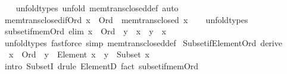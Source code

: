 \begin{isabellebody}
%
\isadelimproof
\ \ %
\endisadelimproof
%
\isatagproof
{}\isamarkupfalse%
\ unfold{\isacharunderscore}{\kern0pt}types\ {\isacharparenleft}{\kern0pt}unfold\ mem{\isacharunderscore}{\kern0pt}trans{\isacharunderscore}{\kern0pt}closed{\isacharunderscore}{\kern0pt}def{\isacharcomma}{\kern0pt}\ auto{\isacharparenright}{\kern0pt}%
\endisatagproof
{\isafoldproof}%
%
\isadelimproof
\isanewline
%
\endisadelimproof
\isanewline
{}\isamarkupfalse%
\ mem{\isacharunderscore}{\kern0pt}trans{\isacharunderscore}{\kern0pt}closed{\isacharunderscore}{\kern0pt}if{\isacharunderscore}{\kern0pt}Ord{\isacharcolon}{\kern0pt}\ {\isachardoublequoteopen}x\ {\isacharcolon}{\kern0pt}\ Ord\ {\isasymLongrightarrow}\ mem{\isacharunderscore}{\kern0pt}trans{\isacharunderscore}{\kern0pt}closed\ x{\isachardoublequoteclose}\isanewline
%
\isadelimproof
\ \ %
\endisadelimproof
%
\isatagproof
{}\isamarkupfalse%
\ unfold{\isacharunderscore}{\kern0pt}types%
\endisatagproof
{\isafoldproof}%
%
\isadelimproof
\isanewline
%
\endisadelimproof
\isanewline
{}\isamarkupfalse%
\ subset{\isacharunderscore}{\kern0pt}if{\isacharunderscore}{\kern0pt}mem{\isacharunderscore}{\kern0pt}Ord\ {\isacharbrackleft}{\kern0pt}elim{\isacharbrackright}{\kern0pt}{\isacharcolon}{\kern0pt}\ {\isachardoublequoteopen}x\ {\isacharcolon}{\kern0pt}\ Ord\ {\isasymLongrightarrow}\ y\ {\isasymin}\ x\ {\isasymLongrightarrow}\ y\ {\isasymsubseteq}\ x{\isachardoublequoteclose}\isanewline
%
\isadelimproof
\ \ %
\endisadelimproof
%
\isatagproof
{}\isamarkupfalse%
\ unfold{\isacharunderscore}{\kern0pt}types\ {\isacharparenleft}{\kern0pt}fastforce\ simp{\isacharcolon}{\kern0pt}\ mem{\isacharunderscore}{\kern0pt}trans{\isacharunderscore}{\kern0pt}closed{\isacharunderscore}{\kern0pt}def{\isacharparenright}{\kern0pt}%
\endisatagproof
{\isafoldproof}%
%
\isadelimproof
\isanewline
%
\endisadelimproof
\isanewline
{}\isamarkupfalse%
\ Subset{\isacharunderscore}{\kern0pt}if{\isacharunderscore}{\kern0pt}Element{\isacharunderscore}{\kern0pt}Ord\ {\isacharbrackleft}{\kern0pt}derive{\isacharbrackright}{\kern0pt}{\isacharcolon}{\kern0pt}\isanewline
\ \ {\isachardoublequoteopen}x\ {\isacharcolon}{\kern0pt}\ Ord\ {\isasymLongrightarrow}\ y\ {\isacharcolon}{\kern0pt}\ Element\ x\ {\isasymLongrightarrow}\ y\ {\isacharcolon}{\kern0pt}\ Subset\ x{\isachardoublequoteclose}\isanewline
\ \ \isanewline
%
\isadelimproof
\ \ %
\endisadelimproof
%
\isatagproof
{}\isamarkupfalse%
\ {\isacharparenleft}{\kern0pt}intro\ SubsetI{\isacharcomma}{\kern0pt}\ drule\ ElementD{\isacharparenright}{\kern0pt}\ {\isacharparenleft}{\kern0pt}fact\ subset{\isacharunderscore}{\kern0pt}if{\isacharunderscore}{\kern0pt}mem{\isacharunderscore}{\kern0pt}Ord{\isacharparenright}{\kern0pt}%

\end{isabellebody}
